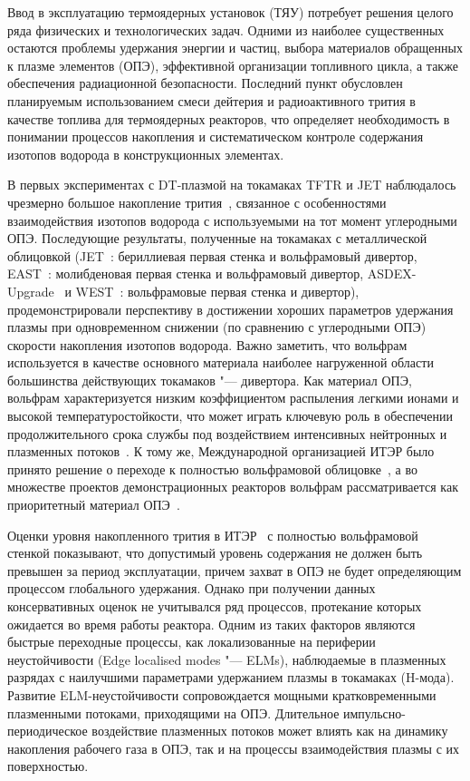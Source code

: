 Ввод в эксплуатацию термоядерных установок (ТЯУ) потребует решения целого ряда физических и технологических задач. Одними из наиболее существенных остаются проблемы удержания энергии и частиц, выбора материалов обращенных к плазме элементов (ОПЭ), эффективной организации топливного цикла, а также обеспечения радиационной безопасности. Последний пункт обусловлен планируемым использованием смеси дейтерия и радиоактивного трития в качестве топлива для термоядерных реакторов, что определяет необходимость в понимании процессов накопления и систематическом контроле содержания изотопов водорода в конструкционных элементах.

В первых экспериментах с DT-плазмой на токамаках TFTR и JET наблюдалось чрезмерно большое накопление трития~\cite{Gasparyan2024}, связанное с особенностями взаимодействия изотопов водорода с используемыми на тот момент углеродными ОПЭ. Последующие результаты, полученные на токамаках с металлической облицовкой (JET~\cite{Maggi2024,Kappatou2025}: бериллиевая первая стенка и вольфрамовый дивертор, EAST~\cite{Gong2024}: молибденовая первая стенка и вольфрамовый дивертор, ASDEX-Upgrade~\cite{Rohde2009} и WEST~\cite{Shi2025}: вольфрамовые первая стенка и дивертор), продемонстрировали перспективу в достижении хороших параметров удержания плазмы при одновременном снижении (по сравнению с углеродными ОПЭ) скорости накопления изотопов водорода. Важно заметить, что вольфрам используется в качестве основного материала наиболее нагруженной области большинства действующих токамаков "--- дивертора. Как материал ОПЭ, вольфрам характеризуется низким коэффициентом распыления легкими ионами и высокой температуростойкости, что может играть ключевую роль в обеспечении продолжительного срока службы под воздействием интенсивных нейтронных и плазменных потоков~\cite{Neu2005}. К тому же, Международной организацией ИТЭР было принято решение о переходе к полностью вольфрамовой облицовке~\cite{Barabaschi2025}, а во множестве проектов демонстрационных реакторов вольфрам рассматривается как приоритетный материал ОПЭ~\cite{Bachmann2016}.

Оценки уровня накопленного трития в ИТЭР~\cite{Roth1,Pitts2025} с полностью вольфрамовой стенкой показывают, что допустимый уровень содержания не должен быть превышен за период эксплуатации, причем захват в ОПЭ не будет определяющим процессом глобального удержания. Однако при получении данных консервативных оценок не учитывался ряд процессов, протекание которых ожидается во время работы реактора. Одним из таких факторов являются быстрые переходные процессы, как локализованные на периферии неустойчивости (Edge localised modes "--- ELMs), наблюдаемые в плазменных разрядах с наилучшими параметрами удержанием плазмы в токамаках (H-мода). Развитие ELM-неустойчивости сопровождается мощными кратковременными плазменными потоками, приходящими на ОПЭ. Длительное импульсно-периодическое воздействие плазменных потоков может влиять как на динамику накопления рабочего газа в ОПЭ, так и на процессы взаимодействия плазмы с их поверхностью.

